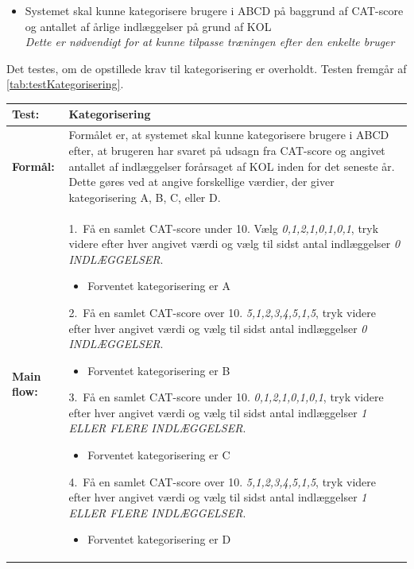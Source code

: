 \begin{itemize}
\item Systemet skal kunne kategorisere brugere i ABCD på baggrund af CAT-score og antallet af årlige indlæggelser på grund af KOL
\\
\textit{Dette er nødvendigt for at kunne tilpasse træningen efter den enkelte bruger}
\end{itemize}

\noindent
Det testes, om de opstillede krav til kategorisering er overholdt. Testen fremgår af \autoref{tab:testKategorisering}.

  \begin{longtable}{ | l | p{13cm} |} \hline
    \textbf{Test:} & Kategorisering  \\ \hline
     \textbf{Formål:} & Formålet er, at systemet skal kunne kategorisere brugere i ABCD efter, at  brugeren har svaret på udsagn fra CAT-score og angivet antallet af indlæggelser forårsaget af KOL inden for det seneste år. Dette gøres ved at angive forskellige værdier, der giver kategorisering A, B, C, eller D.
 \\ \hline
 	\textbf{Main flow:} & 1.~Få en samlet CAT-score under 10. Vælg \textit{0,1,2,1,0,1,0,1}, tryk videre efter hver angivet værdi og vælg til sidst antal indlæggelser \textit{0 INDLÆGGELSER}. 
 	\begin{itemize} 
 	\item Forventet kategorisering er A
 	\end{itemize}	
 	2.~Få en samlet CAT-score over 10. \textit{5,1,2,3,4,5,1,5}, tryk videre efter hver angivet værdi og vælg til sidst antal indlæggelser \textit{0 INDLÆGGELSER}.
 	\begin{itemize}
 	\item Forventet kategorisering er B
 	\end{itemize}
3.~Få en samlet CAT-score under 10. \textit{0,1,2,1,0,1,0,1}, tryk videre efter hver angivet værdi og vælg til sidst antal indlæggelser \textit{1 ELLER FLERE INDLÆGGELSER}.
 \begin{itemize}
  \item Forventet kategorisering er C
  \end{itemize}
4.~Få en samlet CAT-score over 10. \textit{5,1,2,3,4,5,1,5}, tryk videre efter hver angivet værdi og vælg til sidst antal indlæggelser \textit{1 ELLER FLERE INDLÆGGELSER}.
\begin{itemize}
\item Forventet kategorisering er D
\end{itemize}   \\ \hline

\end{longtable}
